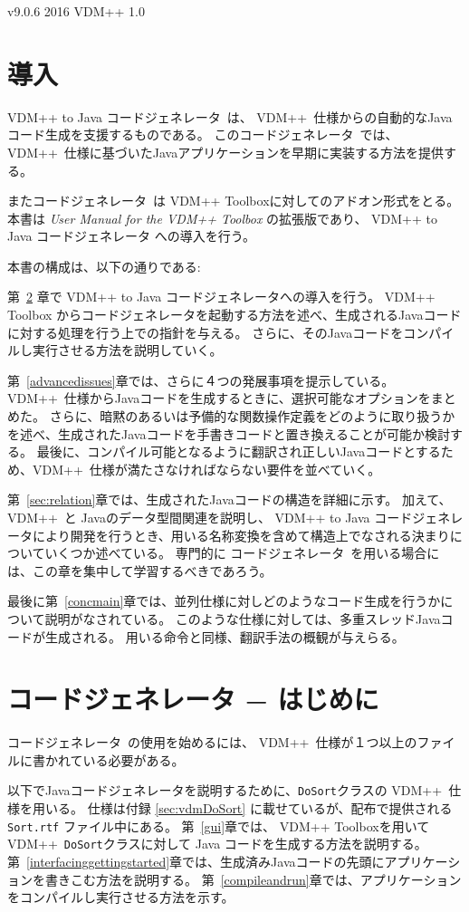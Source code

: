 \documentclass[\pformat,11pt]{jarticle}
\newcommand{\ToolboxName}{VDM++ Toolbox}
\newcommand{\tcg}{コードジェネレータ}
\newcommand{\Tcg}{コードジェネレータ}
\newcommand{\VDM}{VDM++}
\newcommand{\cg}{VDM++ to Java コードジェネレータ}
\begin{document}
\vdmtoolsmanualcsk{\cg}
       {v9.0.6}
       {2016}
       {VDM++}
       {1.0}

\section{導入}

\cg\ は、 \VDM\ 仕様からの自動的なJavaコード生成を支援するものである。
この\Tcg\ では、\VDM\ 仕様に基づいたJavaアプリケーションを早期に実装する方法を提供する。

また\Tcg\ は \ToolboxName{}に対してのアドオン形式をとる。
本書は {\em User Manual for the \VDM{} Toolbox} \cite{UserManPP-CSK} の拡張版であり、 \cg{} への導入を行う。

本書の構成は、以下の通りである:

第~\ref{invoking} 章で \cg{}への導入を行う。
 \ToolboxName{} からコードジェネレータを起動する方法を述べ、生成されるJavaコードに対する処理を行う上での指針を与える。
さらに、そのJavaコードをコンパイルし実行させる方法を説明していく。

第~\ref{advancedissues}章では、さらに４つの発展事項を提示している。
\VDM\ 仕様からJavaコードを生成するときに、選択可能なオプションをまとめた。
さらに、暗黙のあるいは予備的な関数操作定義をどのように取り扱うかを述べ、生成されたJavaコードを手書きコードと置き換えることが可能か検討する。
最後に、コンパイル可能となるように翻訳され正しいJavaコードとするため、\VDM\ 仕様が満たさなければならない要件を並べていく。

第~\ref{sec:relation}章では、生成されたJavaコードの構造を詳細に示す。
加えて、\VDM\ と Javaのデータ型間関連を説明し、 \cg{}により開発を行うとき、用いる名称変換を含めて構造上でなされる決まりについていくつか述べている。
専門的に \tcg\ を用いる場合には、この章を集中して学習するべきであろう。

最後に第~\ref{concmain}章では、並列仕様に対しどのようなコード生成を行うかについて説明がなされている。
このような仕様に対しては、多重スレッドJavaコードが生成される。
用いる命令と同様、翻訳手法の概観が与えらる。
\newpage

\section{コードジェネレータ − はじめに}\label{invoking}

 \tcg\ の使用を始めるには、 \VDM\ 仕様が１つ以上のファイルに書かれている必要がある。

以下でJavaコードジェネレータを説明するために、{\tt DoSort}クラスの \VDM\ 仕様を用いる。
仕様は付録 \ref{sec:vdmDoSort} に載せているが、配布で提供される {\tt Sort.rtf} ファイル中にある。
第~\ref{gui}章では、 \ToolboxName{}を用いて\VDM\ {\tt DoSort}クラスに対して Java コードを生成する方法を説明する。
第~\ref{interfacinggettingstarted}章では、生成済みJavaコードの先頭にアプリケーションを書きこむ方法を説明する。
第~\ref{compileandrun}章では、アプリケーションをコンパイルし実行させる方法を示す。
\end{document}
